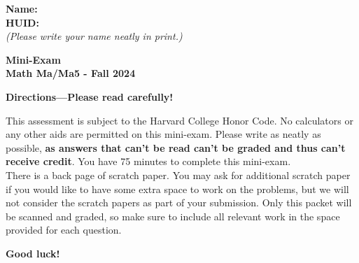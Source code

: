 \documentclass{article}
\begin{document}
\noindent
{\large \mbox{} \hfill \bf Name:\underline{\hspace{3in}}}\\

{\large \mbox{} \hfill \bf HUID:\underline{\hspace{3in}}}\\
{\mbox{} \hfill \it (Please write your name neatly in print.)}\\


 
\medskip
 
\noindent
{\large\bf
Mini-Exam \\ Math Ma/Ma5 - Fall 2024}
\noindent


{\Large
\begin{center}\textbf{Directions---Please read carefully!} \end{center}}



This assessment is subject to the Harvard College Honor Code. No calculators or any other aids are permitted on this mini-exam.  Please write as neatly as possible, \textbf{as answers that can't be read can't be graded and thus can't receive credit}. You have 75 minutes to complete this mini-exam.   \\

There is a back page of scratch paper. You may ask for additional scratch paper if you would like to have some extra space to work on the problems, but we will not consider the scratch papers as part of your submission. Only this packet will be scanned and graded, so make sure to include all relevant work in the space provided for each question. 

\begin{center}\textbf{Good luck!}\end{center}
\end{document}
